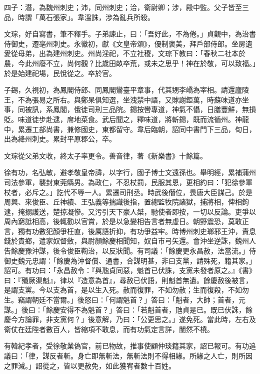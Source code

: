 \begin{pinyinscope}
 四子：潛，為魏州刺史；沛，同州刺史；洽，衛尉卿；涉，殿中監。父子皆至三品，時謂「萬石張家」。韋溫誅，涉為亂兵所殺。



 文琮，好自寫書，筆不釋手。子弟諫止，曰：「吾好此，不為倦。」貞觀中，為治書侍御史，遷亳州刺史。永徽初，獻《文皇帝頌》，優制褒美，拜戶部侍郎。坐房遺愛從母弟，出為建州刺史。州尚淫祀，不立社稷，文琮下教曰：「春秋二社本於農，今此州廢不立，尚何觀？比歲田畝卒荒，或未之思乎！神在於敬，可以致福。」於是始建祀場，民悅從之。卒於官。



 子錫，久視初，為鳳閣侍郎、同鳳閣鸞臺平章事，代其甥李嶠為宰相。請還廬陵王，不為張易之所右。與鄭杲俱知選，坐洩禁中語，又賕謝鉅萬，時蘇味道亦坐事，同被訊，系鳳閣，俄徙司刑三品院。錫按轡專道，神氣不懾，日膳豐鮮，無損貶。味道徒步赴逮，席地菜食。武后聞之，釋味道，將斬錫，既而流循州。神龍中，累遷工部尚書，兼修國史，東都留守。韋后臨朝，詔同中書門下三品，旬日，出為絳州刺史。累封平原郡公，卒。



 文琮從父弟文收，終太子率更令。善音律，著《新樂書》十餘篇。



 徐有功，名弘敏，避孝敬皇帝諱，以字行，國子博士文遠孫也。舉明經，累補蒲州司法參軍，襲封東莞縣男。為政仁，不忍杖罰，民服其恩，更相約曰：「犯徐參軍杖者，必斥之。」訖代不辱一人。累遷司刑丞。時武後僭位，畏唐大臣謀己。於是周興、來俊臣、丘神績、王弘義等揣識後指，置總監牧院諸獄，捕將相，俾相鉤逮，掩搦護送，楚掠凝慘。又污引天下豪人桀，馳使者即按，一切以反論。吏爭以周內窮詆相高，後輒勸以官賞，於是以急變相告言者無虛日。朝野震恐，莫敢正言，獨有功數犯顏爭枉直，後厲語折抑，有功爭益牢。時博州刺史瑯邪王沖，責息錢於貴鄉，遣家奴督斂，與尉顏餘慶相聞知，奴自市弓矢還。會沖坐逆誅，魏州人告餘慶豫沖謀，後令俊臣鞫治，以反狀聞。有司議：「餘慶更永昌赦，法當流。」侍御史魏元忠謂：「餘慶為沖督償、通書，合謀明甚，非曰支黨，請殊死，籍其家。」詔可。有功曰：「永昌赦令：『與虺貞同惡，魁首已伏誅，支黨未發者原之。』《書》曰：『殲厥渠魁』，律以『造意為首』，尋赦已伏語，則魁首無遺。餘慶赦後被言，是謂支黨。今以支為首，是以生入死。赦而復罪，不如勿赦；生而復殺，不如勿生。竊謂朝廷不當爾。」後怒曰：「何謂魁首？」答曰：「魁者，大帥；首者，元謀。」後曰：「餘慶安得不為魁首？」答曰：「若魁首者，虺貞是已。既已伏誅，餘慶今方論罪，非支黨何？」後意解，乃曰：「公更思之。」遂免死。當此時，左右及衛仗在廷陛者數百人，皆縮項不敢息，而有功氣定言詳，闉然不橈。



 有韓紀孝者，受徐敬業偽官，前已物故，推事使顧仲琰籍其家，詔已報可。有功追議曰：「律，謀反者斬。身亡即無斬法，無斬法則不得相緣。所緣之人亡，則所因之罪減。」詔從之，皆以更赦免，如此獲宥者數十百姓。




\end{pinyinscope}
